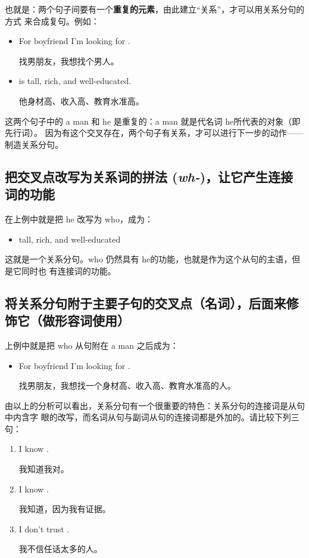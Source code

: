 也就是：两个句子间要有一个\textbf{重复的元素}，由此建立“关系”，才可以用关系分句的方式
来合成复句。例如：

\begin{itemize}
\item For boyfriend I'm looking for .

  找男朋友，我想找个男人。
\item {} is tall, rich, and well-educated.

  他身材高、收入高、教育水准高。
\end{itemize}
这两个句子中的 a man 和 he 是重复的：a man 就是代名词 he所代表的对象（即先行词）。
因为有这个交叉存在，两个句子有关系，才可以进行下一步的动作——制造关系分句。

\subsection{把交叉点改写为关系词的拼法 (\emph{wh-})，让它产生连接词的功能}

在上例中就是把 he 改写为 who，成为：
\begin{itemize}
\item {}  tall, rich, and well-educated
\end{itemize}
这就是一个关系分句。who 仍然具有 he的功能，也就是作为这个从句的主语，但是它同时也
有连接词的功能。

\subsection{将关系分句附于主要子句的交叉点（名词），后面来修饰它（做形容词使用）}

上例中就是把 who 从句附在 a man 之后成为：
\begin{itemize}
\item For boyfriend I'm looking for  .

  找男朋友，我想找一个身材高、收入高、教育水准高的人。
\end{itemize}

由以上的分析可以看出，关系分句有一个很重要的特色：关系分句的连接词是从句中内含字
眼的改写，而名词从句与副词从句的连接词都是外加的。请比较下列三句：

\begin{enumerate}
\item I know .

  我知道我对。
\item I know   .

  我知道，因为我有证据。
\item I don't trust  .

  我不信任话太多的人。
\end{enumerate}

